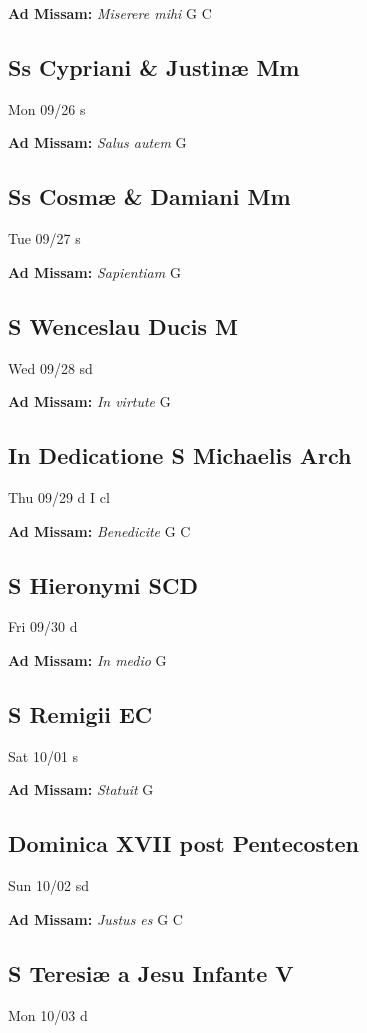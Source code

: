 \documentclass[letterpaper, 10pt, twocolumn]{article}
\begin{document}
\textbf{Ad Missam:} \textit{Miserere mihi} G C 

\subsection*{Ss Cypriani \& Justinæ Mm}Mon 09/26 s

\textbf{Ad Missam:} \textit{Salus autem} G 

\subsection*{Ss Cosmæ \& Damiani Mm}Tue 09/27 s

\textbf{Ad Missam:} \textit{Sapientiam} G 

\subsection*{S Wenceslau Ducis M}Wed 09/28 sd

\textbf{Ad Missam:} \textit{In virtute} G 

\subsection*{In Dedicatione S Michaelis Arch}Thu 09/29 d I cl

\textbf{Ad Missam:} \textit{Benedicite} G C 

\subsection*{S Hieronymi SCD}Fri 09/30 d

\textbf{Ad Missam:} \textit{In medio} G 

\subsection*{S Remigii EC}Sat 10/01 s

\textbf{Ad Missam:} \textit{Statuit} G 

\subsection*{Dominica XVII post Pentecosten}Sun 10/02 sd

\textbf{Ad Missam:} \textit{Justus es} G C 

\subsection*{S Teresiæ a Jesu Infante V}Mon 10/03 d
\end{document}
